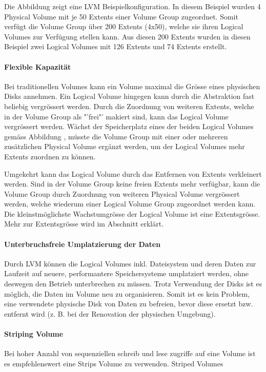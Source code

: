 Die Abbildung  zeigt eine LVM Beispielkonfiguration. In diesem Beispiel wurden 4 Physical Volume mit je 50 Extents einer Volume Group zugeordnet. Somit verfügt die Volume Group über 200 Extents (4x50), welche sie ihren Logical Volumes zur Verfügung stellen kann. Aus diesen 200 Extents wurden in diesen Beispiel zwei Logical Volumes mit 126 Extents und 74 Extents erstellt. 

\paragraph{Flexible Kapazität} $\;$\\
Bei traditionellen Volumes kann ein Volume maximal die Grösse eines physischen Disks annehmen. Ein Logical Volume hingegen kann durch die Abstraktion fast beliebig vergrössert werden.
Durch die Zuordnung von weiteren Extents, welche in der Volume Group als "'frei"' makiert sind, kann das Logical Volume vergrössert werden. Wächst der Speicherplatz eines der beiden Logical Volumes gemäss Abbildung  , müsste die Volume Group mit einer oder mehreren zusätzlichen Physical Volume ergänzt werden, um der Logical Volumes mehr Extents zuordnen zu können.

Umgekehrt kann das Logical Volume durch das Entfernen von Extents verkleinert werden. Sind in der Volume Group keine freien Extents mehr verfügbar, kann die Volume Group durch Zuordnung von weiteren Physical Volume vergrössert werden, welche wiederum einer Logical Volume Group zugeordnet werden kann.
Die kleinstmöglichste Wachstumgrösse der Logical Volume ist eine Extentsgrösse. Mehr zur Extentsgrösse wird im Abschnitt  erklärt. 

\paragraph{Unterbruchsfreie Umplatzierung der Daten} $\;$\\
Durch LVM können die Logical Volumes inkl. Dateisystem und deren Daten zur Laufzeit auf neuere, performantere Speichersysteme umplatziert werden, ohne deswegen den Betrieb unterbrechen zu müssen. Trotz Verwendung der Disks ist es möglich, die Daten im Volume neu zu organisieren. Somit ist es kein Problem, eine verwendete physische Disk von Daten zu befreien, bevor diese ersetzt bzw. entfernt wird (z. B. bei der Renovation der physischen Umgebung).


\paragraph{Striping Volume} $\;$\\
Bei hoher Anzahl von sequenziellen schreib und lese zugriffe auf eine Volume ist es empfehlenswert eine Strips Volume zu verwenden. Striped Volumes 


